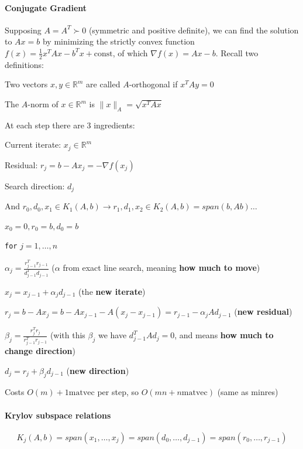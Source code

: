 \documentclass[10pt]{report}
\begin{document}
\paragraph{Conjugate Gradient} Supposing $A=A^T \succ 0$ (symmetric and positive definite), we can find the solution to $Ax = b$ by minimizing the strictly convex function $f(x) = \frac{1}{2}x^TAx-b^Tx + \text{const}$, of which $\nabla f(x) = Ax-b$. Recall two definitions:
\begin{list}{}{}
	\item Two vectors $x, y\in\mathbb{R}^m$ are called $A$-orthogonal if $x^TAy=0$
	\item The $A$-norm of $x\in\mathbb{R}^m$ is $\|x\|_A=\sqrt{x^TAx}$
\end{list}
At each step there are 3 ingredients:
\begin{list}{}{}
	\item Current iterate: $x_j\in \mathbb{R}^m$
	\item Residual: $r_j = b-Ax_j = -\nabla f(x_j)$ 
	\item Search direction: $d_j$
\end{list}
And $r_0,d_0,x_1\in K_1(A,b) \rightarrow r_1,d_1,x_2\in K_2(A,b)=span(b,Ab)\ldots$
\begin{list}{}{}
	\item $x_0=0, r_0=b, d_0=b$
	\item \texttt{for} $j=1,\ldots,n$
	\begin{list}{}{}
		\item $\alpha_j = \frac{r^T_{j-1}r_{j-1}}{d^T_{j-1}d_{j-1}}$ ($\alpha$ from exact line search, meaning \textbf{how much to move})
		\item $x_j = x_{j-1}+\alpha_jd_{j-1}$ (the \textbf{new iterate})
		\item $r_j = b-Ax_j = b-Ax_{j-1}-A(x_j-x_{j-1}) = r_{j-1}-\alpha_jAd_{j-1}$ (\textbf{new residual})
		\item $\beta_j=\frac{r_j^Tr_j}{r_{j-1}^Tr_{j-1}}$ (with this $\beta_j$ we have $d_{j-1}^TAd_j=0$, and means \textbf{how much to change direction})
		\item $d_j = r_j+\beta_jd_{j-1}$ (\textbf{new direction})
	\end{list}
\end{list}
Costs $O(m)+ 1\text{matvec}$ per step, so $O(mn+n\text{matvec})$ (same as minres)
\paragraph{Krylov subspace relations} $$K_j(A,b) = span(x_1,\ldots,x_j) = span(d_0,\ldots,d_{j-1}) = span(r_0,\ldots,r_{j-1})$$
\end{document}
